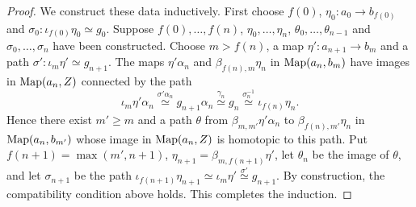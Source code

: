 \begin{proof}
		We construct these data inductively. First choose $f(0)$, $\eta_0\colon a_0 \to b_{f(0)}$ and $\sigma_0\colon \iota_{f(0)}\eta_0 \simeq g_0$. Suppose $f(0),\dots,f(n)$, $\eta_0,\dots,\eta_n$, $\theta_0,\dots,\theta_{n-1}$ and $\sigma_0,\dots,\sigma_n$ have been constructed. Choose $m > f(n)$, a map $\eta'\colon a_{n+1} \to b_m$ and a path $\sigma'\colon \iota_m\eta' \simeq g_{n+1}$. The maps $\eta'\alpha_n$ and $\beta_{f(n),m}\eta_n$ in $\operatorname{Map}(a_n,b_m)$ have images in $\operatorname{Map}(a_n,Z)$ connected by the path
		\[
			\iota_m\eta'\alpha_n \overset{\sigma'\alpha_n}{\simeq} g_{n+1}\alpha_n \overset{\gamma_n}{\simeq} g_n \overset{\sigma_n^{-1}}{\simeq} \iota_{f(n)}\eta_n.
		\]
		Hence there exist $m' \geq m$ and a path $\theta$ from $\beta_{m,m'}\eta'\alpha_n$ to $\beta_{f(n),m'}\eta_n$ in $\operatorname{Map}(a_n,b_{m'})$ whose image in $\operatorname{Map}(a_n,Z)$ is homotopic to this path. Put $f(n+1) = \max(m',n+1)$, $\eta_{n+1} = \beta_{m,f(n+1)}\eta'$, let $\theta_n$ be the image of $\theta$, and let $\sigma_{n+1}$ be the path $\iota_{f(n+1)}\eta_{n+1} \simeq \iota_m\eta' \overset{\sigma'}{\simeq} g_{n+1}$. By construction, the compatibility condition above holds. This completes the induction.
	\end{proof}

